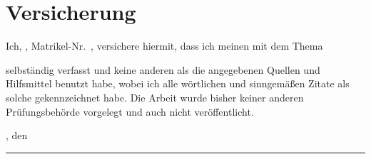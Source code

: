 
\chapter*{Versicherung}
\thispagestyle{empty}

Ich, \autor, Matrikel-Nr.\ \matrikelnr, versichere hiermit, dass ich meinen \art\xspace mit dem Thema

\begin{quote}
\textit{\titel} %
\end{quote}

selbständig verfasst und keine anderen als die angegebenen Quellen und Hilfsmittel benutzt habe, wobei ich alle wörtlichen und sinngemäßen Zitate als solche gekennzeichnet habe. Die Arbeit wurde bisher keiner anderen Prüfungsbehörde vorgelegt und auch nicht veröffentlicht.

\vspace{8ex}

\ort, den \abgabeDatum

\vspace{6ex}


\rule[-0.2cm]{5cm}{0.5pt}

\textsc{\autor} 
